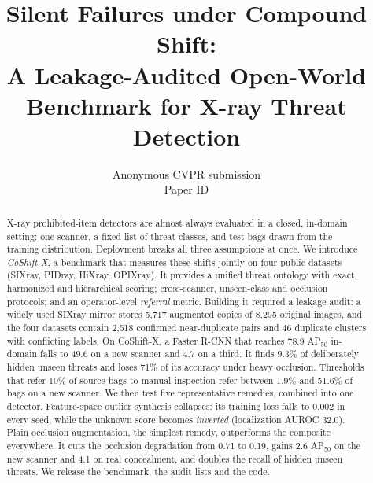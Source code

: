 \documentclass[10pt,twocolumn,letterpaper]{article}
\title{Silent Failures under Compound Shift:\\A Leakage-Audited Open-World Benchmark for X-ray Threat Detection}
\author{Anonymous CVPR submission\\Paper ID \paperID}
\begin{document}
\maketitle

\begin{abstract}
X-ray prohibited-item detectors are almost always evaluated in a closed, in-domain setting: one scanner, a fixed list of threat classes, and test bags drawn from the training distribution. Deployment breaks all three assumptions at once. We introduce \emph{CoShift-X}, a benchmark that measures these shifts jointly on four public datasets (SIXray, PIDray, HiXray, OPIXray). It provides a unified threat ontology with exact, harmonized and hierarchical scoring; cross-scanner, unseen-class and occlusion protocols; and an operator-level \emph{referral} metric. Building it required a leakage audit: a widely used SIXray mirror stores 5{,}717 augmented copies of 8{,}295 original images, and the four datasets contain 2{,}518 confirmed near-duplicate pairs and 46 duplicate clusters with conflicting labels. On CoShift-X, a Faster R-CNN that reaches 78.9 AP$_{50}$ in-domain falls to 49.6 on a new scanner and 4.7 on a third. It finds 9.3\% of deliberately hidden unseen threats and loses 71\% of its accuracy under heavy occlusion. Thresholds that refer 10\% of source bags to manual inspection refer between 1.9\% and 51.6\% of bags on a new scanner. We then test five representative remedies, combined into one detector. Feature-space outlier synthesis collapses: its training loss falls to 0.002 in every seed, while the unknown score becomes \emph{inverted} (localization AUROC 32.0). Plain occlusion augmentation, the simplest remedy, outperforms the composite everywhere. It cuts the occlusion degradation from 0.71 to 0.19, gains 2.6 AP$_{50}$ on the new scanner and 4.1 on real concealment, and doubles the recall of hidden unseen threats. We release the benchmark, the audit lists and the code.
\end{abstract}

\end{document}
